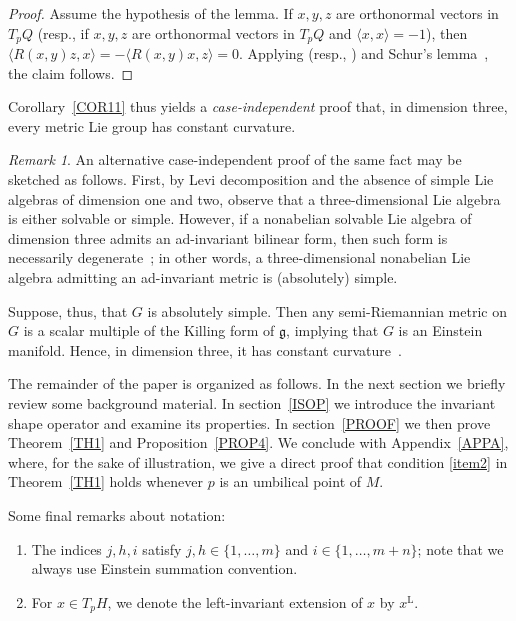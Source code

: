 \documentclass[a4paper,12pt,oneside]{amsart}
\theoremstyle{plain}
\theoremstyle{remark}
\newtheorem{remark}[theorem]{Remark}
\theoremstyle{definition}
\newtheorem*{notation*}{Notation}
\begin{document}
\begin{proof}
Assume the hypothesis of the lemma. If $x,y,z$ are orthonormal vectors in $T_{p}Q$ (resp., if $x,y,z$ are orthonormal vectors in $T_{p}Q$ and $\langle x, x \rangle =-1$), then $\langle R(x,y)z,x\rangle = -\langle R(x,y)x,z\rangle=0$. Applying \cite[Lemma~1.17]{dajczer2019} (resp., \cite[Theorem~1a]{dajczer1980}) and Schur's lemma~\cite[p.~96, Exercise 21(b)]{oneill1983}, the claim follows.
\end{proof}

Corollary~\ref{COR11} thus yields a \emph{case-independent} proof that, in dimension three, every metric Lie group has constant curvature.

\begin{remark}\label{alternativeProof}
An alternative case-independent proof of the same fact may be sketched as follows. First, by Levi decomposition and the absence of simple Lie algebras of dimension one and two, observe that a three-dimensional Lie algebra is either solvable or simple. However, if a nonabelian solvable Lie algebra of dimension three admits an ad-invariant bilinear form, then such form is necessarily degenerate~\cite[Proposition~2.3]{delbarco2014}; in other words, a three-dimensional nonabelian Lie algebra admitting an ad-invariant metric is (absolutely) simple.

Suppose, thus, that $G$ is absolutely simple. Then any semi-Riemannian metric on $G$ is a scalar multiple of the Killing form of $\mathfrak{g}$, implying that $G$ is an Einstein manifold. Hence, in dimension three, it has constant curvature~\cite[p.~49]{besse2008}.
\end{remark}

The remainder of the paper is organized as follows.
In the next section we briefly review some background material. In section~\ref{ISOP} we introduce the invariant shape operator and examine its properties. In section~\ref{PROOF} we then prove Theorem~\ref{TH1} and Proposition~\ref{PROP4}. We conclude with Appendix~\ref{APPA}, where, for the sake of illustration, we give a direct proof that condition \ref{item2} in Theorem~\ref{TH1} holds whenever $p$ is an umbilical point of $M$.

Some final remarks about notation:
\begin{enumerate}
\item The indices $j,h,i$ satisfy $j,h \in \{1, \dotsc, m\}$ and $i \in \{1, \dotsc, m+n\}$; note that we always use Einstein summation convention.
\item For $x \in T_{p}H$, we denote the left-invariant extension of $x$ by $x^{\mathrm{L}}$.
\end{enumerate}
\end{document}
